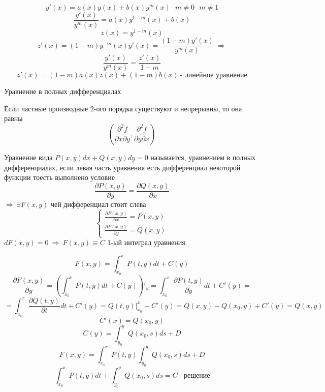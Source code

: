 \begin{block}
  $$
  y'(x) = a(x)y(x) + b(x)y^m(x) ~~~ m \not= 0 ~~~ m \not= 1
  $$
  $$
  \frac{y'(x)}{y^m(x)} = a(x) y^{1 - m}(x) + b(x)
  $$
  $$
  z(x) = y^{1 - m}(x)
  $$
  $$
  z'(x) = (1 - m) y^{-m}(x) y'(x) = \frac{(1-m)y'(x)}{y^m(x)} ~ \Rightarrow
  $$
  $$
  \frac{y'(x)}{y^m(x)} = \frac{z'(x)}{1 - m}
  $$
  $$
  z'(x) = (1 - m) a(x)z(x) + (1 - m)b(x) ~
  \text{- линейное уравнение}
  $$
\end{block}

\begin{title}[\Large]
  Уравнение в полных дифференциалах
\end{title}

Если частные производные 2-ого порядка существуют и непрерывны, то она равны
$$
\left( \frac{\partial^2 f}{\partial x \partial y},
\frac{\partial^2 f}{\partial y \partial x} \right)
$$

\begin{define}
  Уравнение вида $P(x, y)dx + Q(x, y)dy = 0$ называется, уравнением в полных
  дифференциалах, если левая часть уравнения есть дифференциал некоторой
  функции тоесть выполнено условие
  $$
  \frac{\partial P(x, y)}{\partial y} = \frac{\partial Q(x, y)}{\partial x}
  $$
  $\Rightarrow ~ \exists F(x, y)$ чей дифференциал стоит слева
  $$
  \left\{
  \begin{array}{l}
    \frac{\partial F(x, y)}{\partial x} = P(x, y) \\
    \frac{\partial F(x, y)}{\partial y} = Q(x, y)
  \end{array}
  \right.
  $$
  $dF(x, y) = 0 ~ \Rightarrow ~ F(x, y) \equiv C$ 1-ый интеграл уравнения
\end{define}

\begin{block}
  $$
  F(x, y) = \int_{x_0}^x P(t, y)dt + C(y)
  $$
  $$
  \frac{\partial F(x, y)}{\partial y} =
  \left( \int_{x_0}^x P(t, y)dt + C(y) \right)'_y =
  \int_{x_0}^x \frac{\partial P(t, y)}{\partial y} dt + C'(y) =
  $$
  $$
  = \int_{x_0}^x \frac{\partial Q(t, y)}{\partial t} dt + C'(y) =
  Q(t, y)|_{x_0}^x + C'(y) = Q(x, y) - Q(x_0, y) + C'(y) = Q(x, y)
  $$
  $$
  C'(x) = Q(x_0, y)
  $$
  $$
  C(y) = \int_{y_0}^y Q(x_0, s) ds + D
  $$
  $$
  F(x, y) = \int_{x_0}^x P(t, y) \int_{y_0}^y Q(x_0, s) ds + D
  $$
  $$
  \int_{x_0}^x P(t, y)dt + \int_{y_0}^y Q(x_0, s) ds = C ~ \text{- решение}
  $$
\end{block}

